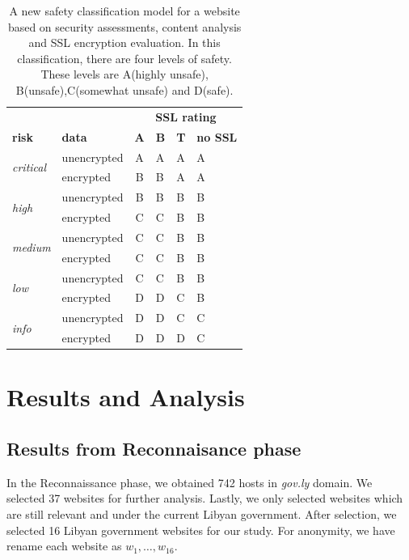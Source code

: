 \documentclass[conference]{IEEEtran}
\begin{document}
\begin{table}[thbp]
	\caption{A new safety classification model for a website based on security assessments, content analysis
		and SSL encryption evaluation. In this classification, there are four
		levels of safety. These levels are A(highly unsafe), B(unsafe),C(somewhat unsafe) and D(safe).}
	\label{tab:class}
	\centering
	\begin{tabular}{llclll}
		&  & \multicolumn{4}{c}{\textbf{SSL rating}} \\ \cline{3-6} 
		\textbf{risk}& \textbf{data} & \textbf{A} & \textbf{B} & \textbf{T} &
		\textbf{no SSL} \\ \hline
		\multirow{2}{*}{\textit{critical}} & unencrypted & A & A & A & A\\
		& encrypted & B & B & A & A \\ \hline
		\multirow{2}{*}{\textit{high}} & unencrypted & B & B & B & B \\
		& encrypted & C & C & B & B \\ \hline
		\multirow{2}{*}{\textit{medium}} & unencrypted & C & C & B & B \\
		& encrypted & C & C & B & B \\ \hline
		\multirow{2}{*}{\textit{low}} & unencrypted & C & C & B & B \\ &
		encrypted & D & D & C & B \\ \hline
		\multirow{2}{*}{\textit{info}} & unencrypted & D & D & C & C \\
		\cline{2-6}
		& encrypted & D & D & D & C \\ \hline
	\end{tabular}
	\end{table}


\section{Results and Analysis}


\subsection{Results from Reconnaisance phase}

In the Reconnaissance phase, we obtained 742 hosts in \emph{gov.ly} domain. We selected 37 websites for further analysis. Lastly, we only selected websites which are still relevant and under the current Libyan government. After selection, we selected 16 Libyan government websites for our study. For anonymity, we have rename each website as $w_1,\ldots,w_{16}$.
\end{document}

